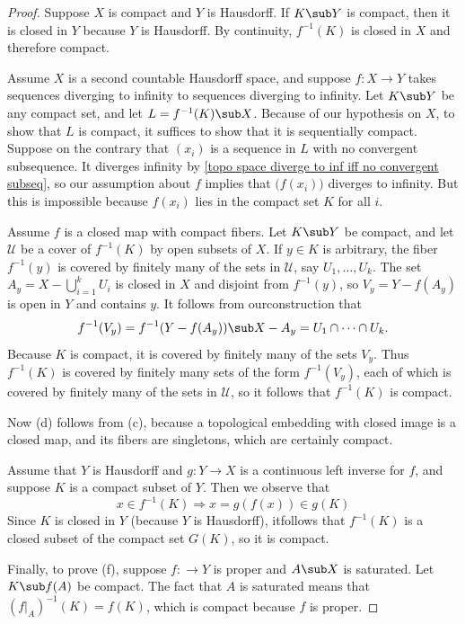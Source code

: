 \begin{proof}
Suppose $X$ is compact and $Y$ is Hausdorff. If $K\sub Y$ is
compact, then it is closed in $Y$ because $Y$ is Hausdorff. By continuity, $f^{-1}(K)$ is closed in $X$ and therefore compact.\par
Assume $X$ is a second countable Hausdorff space, and suppose
$f:X\to Y$ takes sequences diverging to infinity to sequences diverging to infinity. Let $K\sub Y$ be any compact set, and let $L=f^{-1}(K)\sub X$. Because of our hypothesis on $X$, to show that $L$ is compact, it suffices to show that it is sequentially compact. Suppose on the contrary that $(x_i)$ is a sequence in $L$ with no convergent subsequence. It diverges infinity by \cref{topo space diverge to inf iff no convergent subseq}, so our assumption about $f$ implies that $\big(f(x_i)\big)$ diverges to infinity. But this is impossible because $f(x_i)$ lies in the compact set $K$ for all $i$.\par
Assume $f$ is a closed map with compact fibers. Let $K\sub Y$ be compact, and let $\mathcal{U}$ be a cover of $f^{-1}(K)$ by open subsets of $X$. If $y\in K$ is arbitrary, the fiber $f^{-1}(y)$ is covered by finitely many of the sets in $\mathcal{U}$, say $U_1,\dots,U_k$. The set $A_y=X-\bigcup_{i=1}^{k}U_i$ is closed in $X$ and disjoint from $f^{-1}(y)$, so $V_y=Y-f(A_y)$ is open in $Y$ and contains $y$. It follows from ourconstruction that 
\[f^{-1}(V_y)=f^{-1}(Y-f(A_y))\sub X-A_y=U_1\cap\cdots\cap U_k.\] 
Because $K$ is compact, it is covered by finitely many of the sets $V_y$. Thus $f^{-1}(K)$ is covered by finitely many sets of the form $f^{-1}(V_y)$, each of which is covered by finitely many of the sets in $\mathcal{U}$, so it follows that $f^{-1}(K)$ is compact.\par
Now (d) follows from (c), because a topological embedding with closed image is a closed map, and its fibers are singletons, which are certainly compact.\par
Assume that $Y$ is Hausdorff and $g:Y\to X$ is a continuous left inverse for $f$, and suppose $K$ is a compact subset of $Y$. Then we observe that
\[x\in f^{-1}(K)\Rightarrow x=g(f(x))\in g(K)\] 
Since $K$ is closed in $Y$ (because $Y$ is Hausdorff), itfollows that $f^{-1}(K)$ is a closed subset of the compact set $G(K)$, so it is compact.\par
Finally, to prove (f), suppose $f:\to Y$ is proper and $A\sub X$ is saturated. Let
$K\sub f(A)$ be compact. The fact that $A$ is saturated means that $(f|_A)^{-1}(K)=f(K)$, which is compact because $f$ is proper.
\end{proof}
